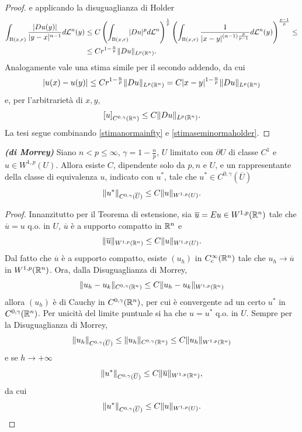 \begin{teorema}
\begin{proof}
		e applicando la disuguaglianza di Holder
		\begin{align*}
			\int_{\textup{B}(x,r)} \frac{\lvert Du(y)\rvert}{\lvert y-x\rvert^{n-1}}d\mathcal{L}^n(y) &\le C \left( \int_{\textup{B}(x,r)} \lvert Du\rvert^pd\mathcal{L}^n\right) ^{\frac{1}{p}}\left( \int_{\textup{B}(x,r)} \dfrac{1}{\lvert x-y\rvert^{(n-1)\frac{p}{p-1}}} d\mathcal{L}^n(y) \right)^{\frac{p-1}{p}} \le \\
			&\le C r^{1-\frac{n}{p}}\lVert Du\rVert_{L^p(\mathbb{R}^n)}.
		\end{align*}
		Analogamente vale una stima simile per il secondo addendo, da cui
		\[ \lvert u(x)-u(y)\rvert \le  C r^{1-\frac{n}{p}}\lVert Du\rVert_{L^p(\mathbb{R}^n)} = C \lvert x-y\rvert^{1-\frac{n}{p}}\lVert Du\rVert_{L^p(\mathbb{R}^n)}\]
		e, per l'arbitrarietà di $x,y$,
		\begin{equation}\label{stimaseminormaholder}
			\left[ u\right] _{C^{0,\gamma}(\mathbb{R}^n)} \le C\lVert Du\rVert_{L^p(\mathbb{R}^n)}.
		\end{equation}
		La tesi segue combinando \eqref{stimanormainfty} e \eqref{stimaseminormaholder}.
	\end{proof}
\end{teorema}
\begin{teorema}\textbf{\emph{(di Morrey)}}
	Siano $n < p \le \infty$, $\gamma = 1 - \frac{n}{p}$, $U$ limitato con $\partial U$ di classe $C^1$ e $u \in W^{1,p}(U)$. Allora esiste $C$, dipendente solo da $p,n$ e $U$, e un rappresentante della classe di equivalenza $u$, indicato con $u^\ast$, tale che $u^\ast \in C^{0,\gamma}(\overline{U})$
	\[ \lVert u^\ast\rVert_{ C^{0,\gamma}(\overline{U})} \le C \lVert u\rVert_{W^{1,p}(U)}.\]
\end{teorema}
\begin{proof}
	Innanzitutto per il Teorema di estensione, sia $\overline{u} = Eu \in W^{1,p}(\mathbb{R}^{n})$ tale che $\overline{u} = u$ q.o. in $U$, $\overline{u}$ è a supporto compatto in $\mathbb{R}^n$ e 
	\[ \lVert\overline{u}\rVert_{W^{1,p}(\mathbb{R}^n)} \le C \lVert u\rVert_{W^{1,p}(U)}. \]
	Dal fatto che $\overline{u}$ è a supporto compatto, esiste $(u_h)$ in $C^\infty_c(\mathbb{R}^n)$ tale che $u_h \to \overline{u}$ in $W^{1,p}(\mathbb{R}^n)$. Ora, dalla Disuguaglianza di Morrey, 
	\[ \lVert u_h - u_k\rVert_{C^{0,\gamma}(\mathbb{R}^n)} \le C\lVert u_h - u_k\rVert_{W^{1,p}(\mathbb{R}^n)} \]
	allora $(u_h)$ è di Cauchy in $C^{0,\gamma}(\mathbb{R}^n)$, per cui è convergente ad un certo $u^\ast$ in $C^{0,\gamma}(\mathbb{R}^n)$. Per unicità del limite puntuale si ha che $u=u^\ast$  q.o. in $U$.  Sempre per la Disuguaglianza di Morrey,
	\[ \lVert u_h\rVert_{C^{0,\gamma}(\overline{U})} \le \lVert u_h\rVert_{C^{0,\gamma}(\mathbb{R}^n)} \le C \lVert u_h\rVert_{W^{1,p}(\mathbb{R}^n)}\]
	e se $h \to +\infty$
	\[ \lVert u^\ast\rVert_{C^{0,\gamma}(\overline{U})} \le C \lVert\overline{u}\rVert_{W^{1,p}(\mathbb{R}^n)}, \]
	da cui 
	\[ \lVert u^\ast\rVert_{ C^{0,\gamma}(\overline{U})} \le C \lVert u\rVert_{W^{1,p}(U)}.\qedhere\]
\end{proof}
